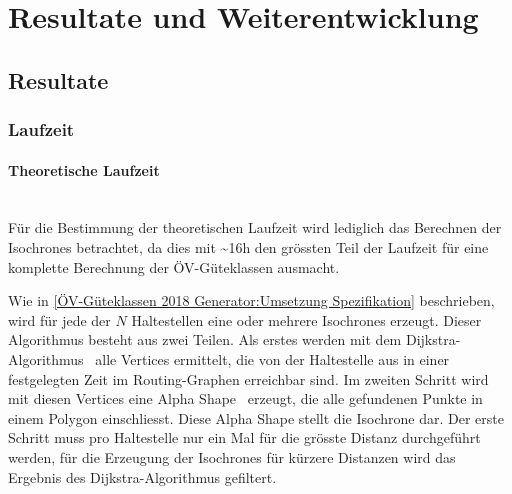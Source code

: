 
\section{Resultate und Weiterentwicklung}
\label{Resultate und Weiterentwicklung}


\subsection{Resultate}
\label{Resultate und Weiterentwicklung:Resultate}

\subsubsection{Laufzeit}
\label{Resultate und Weiterentwicklung:Laufzeit}


\paragraph{Theoretische Laufzeit}~\\
Für die Bestimmung der theoretischen Laufzeit wird lediglich das Berechnen der \glspl{Isochrone} betrachtet, da dies mit \textasciitilde 16h den grössten Teil der Laufzeit für eine komplette Berechnung der \acs{ÖV}-Güteklassen ausmacht.

Wie in \ref{ÖV-Güteklassen 2018 Generator:Umsetzung Spezifikation} beschrieben, wird für jede der $N$ Haltestellen eine oder mehrere \glspl{Isochrone} erzeugt.
Dieser Algorithmus besteht aus zwei Teilen.
Als erstes werden mit dem Dijkstra-Algorithmus~\cite{dijkstra_algorithm} alle Vertices ermittelt, die von der Haltestelle aus in einer festgelegten Zeit im Routing-Graphen erreichbar sind.
Im zweiten Schritt wird mit diesen Vertices eine Alpha Shape~\cite{alpha_shapes} erzeugt, die alle gefundenen Punkte in einem Polygon einschliesst.
Diese Alpha Shape stellt die \gls{Isochrone} dar.
Der erste Schritt muss pro Haltestelle nur ein Mal für die grösste Distanz durchgeführt werden, für die Erzeugung der \glspl{Isochrone} für kürzere Distanzen wird das Ergebnis des Dijkstra-Algorithmus gefiltert.

